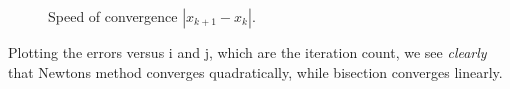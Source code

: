 \documentclass[12pt]{article}
\begin{document}
\begin{multicols}{2}
\begin{figure}[H]
\centering

\caption{
    Speed of convergence $|x_{k+1} - x_k|$.
}
\end{figure}
\noindent
Plotting the errors versus {\ttfamily i} and {\ttfamily j},
which are the iteration count,
we see {\em clearly} that Newtons method converges quadratically,
while bisection converges linearly.


\end{multicols}
\end{document}
